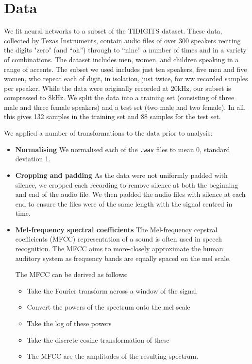 \section{Data} \label{sec:data}
We fit neural networks to a subset of the TIDIGITS dataset. These data, collected by Texas Instruments, contain audio files of over 300 speakers reciting the digits "zero" (and ``oh'') through to ``nine'' a number of times and in a variety of combinations. The dataset includes men, women, and children speaking in a range of accents. The subset we used includes just ten speakers, five men and five women, who repeat each of digit, in isolation, just twice, for ww recorded samples per speaker. While the data were originally recorded at 20kHz, our subset is compressed to 8kHz. We split the data into a training set (consisting of three male and three female speakers) and a test set (two male and two female). In all, this gives 132 samples in the training set and 88 samples for the test set.

 

We applied a number of transformations to the data prior to analysis:
\begin{itemize}
\item \textbf{Normalising} We normalised each of the \texttt{.wav} files to mean 0, standard deviation 1.

\item \textbf{Cropping and padding} As the data were not uniformly padded with silence, we cropped each recording to remove silence at both the beginning and end of the audio file. We then padded the audio files with silence at each end to ensure the files were of the same length with the signal centred in time.

\item \textbf{Mel-frequency spectral coefficients}
The Mel-frequency cepstral coefficients (MFCC) representation of a sound is often used in speech recognition. The MFCC aims to more-closely approximate the human auditory system as frequency bands are equally spaced on the mel scale. 

The MFCC can be derived as follows:
\begin{itemize}
\item Take the Fourier transform across a window of the signal
\item Convert the powers of the spectrum onto the mel scale
\item Take the log of these powers
\item Take the discrete cosine transformation of these
\item The MFCC are the amplitudes of the resulting spectrum.
\end{itemize}
\end{itemize}




